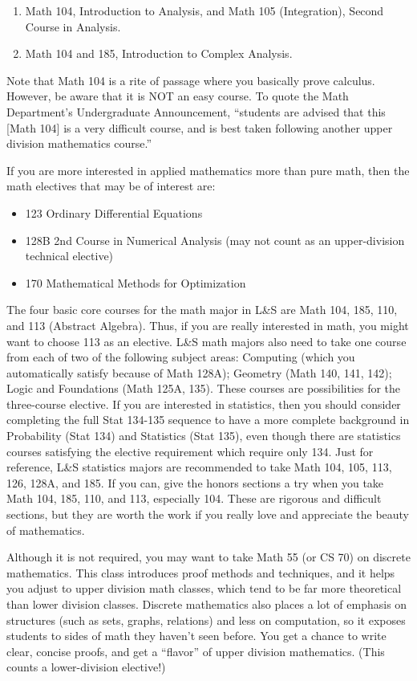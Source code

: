 \begin{enumerate}
  \item Math 104, Introduction to Analysis, and Math 105 (Integration), Second Course in Analysis.
  \item Math 104 and 185, Introduction to Complex Analysis.
\end{enumerate}

Note that Math 104 is a rite of passage where you basically prove calculus. However, be aware that it is NOT an easy course. To quote the Math Department’s Undergraduate Announcement, “students are advised that this [Math 104] is a very difficult course, and is best taken following another upper division mathematics course.”

If you are more interested in applied mathematics more than pure math, then the math electives that may be of interest are:

\begin{itemize}
  \item 123 Ordinary Differential Equations
  \item 128B 2nd Course in Numerical Analysis (may not count as an upper-division technical elective)
  \item 170 Mathematical Methods for Optimization
\end{itemize}

The four basic core courses for the math major in L\&S are Math 104, 185, 110, and 113 (Abstract Algebra). Thus, if you are really interested in math, you might want to choose 113 as an elective. L\&S math majors also need to take one course from each of two of the following subject areas: Computing (which you automatically satisfy because of Math 128A); Geometry (Math 140, 141, 142); Logic and Foundations (Math 125A, 135). These courses are possibilities for the three-course elective. If you are interested in statistics, then you should consider completing the full Stat 134-135 sequence to have a more complete background in Probability (Stat 134) and Statistics (Stat 135), even though there are statistics courses satisfying the elective requirement which require only 134. Just for reference, L\&S statistics majors are recommended to take Math 104, 105, 113, 126, 128A, and 185. If you can, give the honors sections a try when you take Math 104, 185, 110, and 113, especially 104. These are rigorous and difficult sections, but they are worth the work if you really love and appreciate the beauty of mathematics.

Although it is not required, you may want to take Math 55 (or CS 70) on discrete mathematics. This class introduces proof methods and techniques, and it helps you adjust to upper division math classes, which tend to be far more theoretical than lower division classes. Discrete mathematics also places a lot of emphasis on structures (such as sets, graphs, relations) and less on computation, so it exposes students to sides of math they haven't seen before. You get a chance to write clear, concise proofs, and get a “flavor” of upper division mathematics. (This counts a lower-division elective!)

